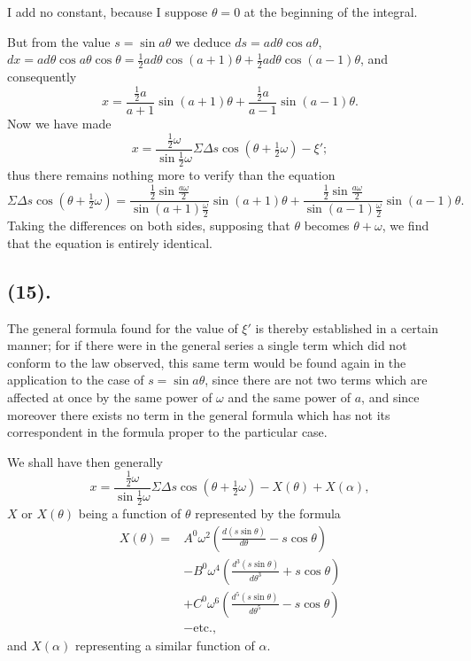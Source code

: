 \documentclass{article}
\begin{document}
I add no constant, because I suppose $\theta=0$ at the beginning of the integral.

But from the value $s=\sin a\theta$ we deduce $ds=ad\theta\cos a\theta$, $dx=ad\theta\cos a\theta\cos\theta=\frac{1}{2}ad\theta\cos(a+1)\theta+\frac{1}{2}ad\theta\cos(a-1)\theta$, and consequently
\[ x=\frac{\frac{1}{2}a}{a+1}\sin(a+1)\theta+\frac{\frac{1}{2}a}{a-1}\sin(a-1)\theta. \]
Now we have made
\[ x=\frac{\frac{1}{2}\omega}{\sin\frac{1}{2}\omega}\Sigma\Delta s\cos(\theta+\tfrac{1}{2}\omega)-\xi'; \]
thus there remains nothing more to verify than the equation
\[ \Sigma\Delta s\cos(\theta+\tfrac{1}{2}\omega)=\frac{\frac{1}{2}\sin\frac{a\omega}{2}}{\sin(a+1)\frac{\omega}{2}}\sin(a+1)\theta+\frac{\frac{1}{2}\sin\frac{a\omega}{2}}{\sin(a-1)\frac{\omega}{2}}\sin(a-1)\theta. \]
Taking the differences on both sides, supposing that $\theta$ becomes $\theta+\omega$, we find that the equation is entirely identical.

\subsection*{(15).}

The general formula found for the value of $\xi'$ is thereby established in a certain manner; for if there were in the general series a single term which did not conform to the law observed, this same term would be found again in the application to the case of $s=\sin a\theta$, since there are not two terms which are affected at once by the same power of $\omega$ and the same power of $a$, and since moreover there exists no term in the general formula which has not its correspondent in the formula proper to the particular case.

We shall have then generally
\[ x=\frac{\frac{1}{2}\omega}{\sin\frac{1}{2}\omega}\Sigma\Delta s\cos(\theta+\tfrac{1}{2}\omega)-X(\theta)+X(\alpha), \]
$X$ or $X(\theta)$ being a function of $\theta$ represented by the formula
\[ \begin{aligned} X(\theta)={}&A^{0}\omega^{2}\left(\frac{d(s\sin\theta)}{d\theta}-s\cos\theta\right)\\ &-B^{0}\omega^{4}\left(\frac{d^{3}(s\sin\theta)}{d\theta^{3}}+s\cos\theta\right)\\ &+C^{0}\omega^{6}\left(\frac{d^{5}(s\sin\theta)}{d\theta^{5}}-s\cos\theta\right)\\ &-\text{etc.}, \end{aligned} \]
and $X(\alpha)$ representing a similar function of $\alpha$.
\end{document}
